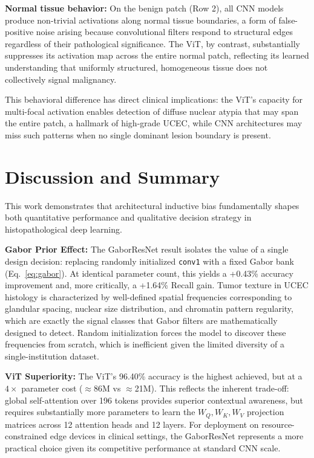 \documentclass[conference]{IEEEtran}
\begin{document}
\textbf{Normal tissue behavior:} On the benign patch (Row 2), all CNN models produce non-trivial activations along normal tissue boundaries, a form of false-positive noise arising because convolutional filters respond to structural edges regardless of their pathological significance. The ViT, by contrast, substantially suppresses its activation map across the entire normal patch, reflecting its learned understanding that uniformly structured, homogeneous tissue does not collectively signal malignancy.

This behavioral difference has direct clinical implications: the ViT's capacity for multi-focal activation enables detection of diffuse nuclear atypia that may span the entire patch, a hallmark of high-grade UCEC, while CNN architectures may miss such patterns when no single dominant lesion boundary is present.

\section{Discussion and Summary}

This work demonstrates that architectural inductive bias fundamentally shapes both quantitative performance and qualitative decision strategy in histopathological deep learning.

\textbf{Gabor Prior Effect:} The GaborResNet result isolates the value of a single design decision: replacing randomly initialized \texttt{conv1} with a fixed Gabor bank (Eq.~\ref{eq:gabor}). At identical parameter count, this yields a +0.43\% accuracy improvement and, more critically, a +1.64\% Recall gain. Tumor texture in UCEC histology is characterized by well-defined spatial frequencies corresponding to glandular spacing, nuclear size distribution, and chromatin pattern regularity, which are exactly the signal classes that Gabor filters are mathematically designed to detect. Random initialization forces the model to discover these frequencies from scratch, which is inefficient given the limited diversity of a single-institution dataset.

\textbf{ViT Superiority:} The ViT's 96.40\% accuracy is the highest achieved, but at a $4\times$ parameter cost ($\approx$86M vs $\approx$21M). This reflects the inherent trade-off: global self-attention over 196 tokens provides superior contextual awareness, but requires substantially more parameters to learn the $W_Q, W_K, W_V$ projection matrices across 12 attention heads and 12 layers. For deployment on resource-constrained edge devices in clinical settings, the GaborResNet represents a more practical choice given its competitive performance at standard CNN scale.
\end{document}
